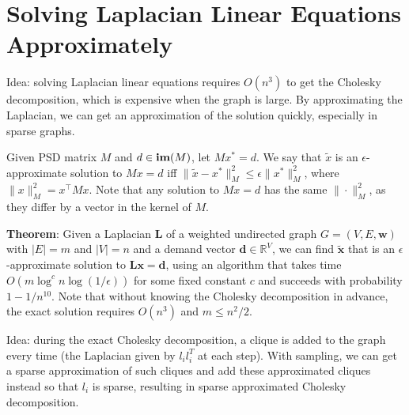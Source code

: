 \section{Solving Laplacian Linear Equations Approximately}

Idea: solving Laplacian linear equations requires $O(n^3)$ to get the Cholesky decomposition, which is expensive when the graph is large. By approximating the Laplacian, we can get an approximation of the solution quickly, especially in sparse graphs.

Given PSD matrix $M$ and $d \in \operatorname{\textbf{im}}(M)$, let $M x^* = d$. We say that $\tilde{x}$ is an $\epsilon$-approximate solution to $Mx=d$ iff $\|\tilde{x} - x^*\|_M^2 \le \epsilon \|x^*\|_M^2$, where $\|x\|_M^2 = x^\top M x$. Note that any solution to $M x = d$ has the same $\|\cdot\|_M^2$, as they differ by a vector in the kernel of $M$.

\textbf{Theorem}: Given a Laplacian $\boldsymbol{L}$ of a weighted undirected graph $G=(V, E, \boldsymbol{w})$ with $|E|=m$ and $|V|=n$ and a demand vector $\boldsymbol{d} \in \mathbb{R}^{V}$, we can find $\tilde{\boldsymbol{x}}$ that is an $\epsilon$-approximate solution to $\boldsymbol{L x}=\boldsymbol{d}$, using an algorithm that takes time $O\left(m \log ^{c} n \log (1 / \epsilon)\right)$ for some fixed constant $c$ and succeeds with probability $1-1 / n^{10}$. Note that without knowing the Cholesky decomposition in advance, the exact solution requires $O(n^3)$ and $m \le n^2 / 2$.

Idea: during the exact Cholesky decomposition, a clique is added to the graph every time (the Laplacian given by $l_i l_i^T$ at each step). With sampling, we can get a sparse approximation of such cliques and add these approximated cliques instead so that $l_i$ is sparse, resulting in sparse approximated Cholesky decomposition.